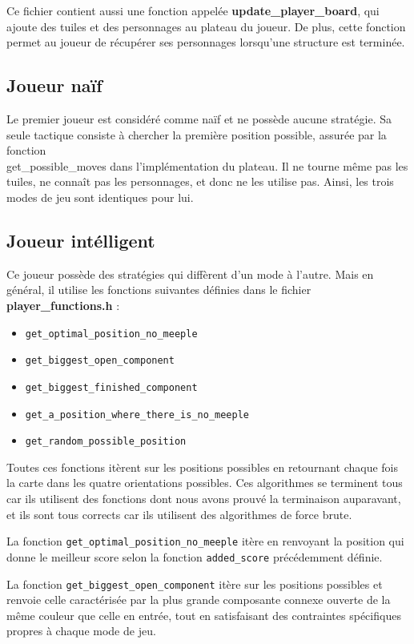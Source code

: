 \documentclass[10pt]{article}
\begin{document}
Ce fichier contient aussi une fonction appelée \textbf{update\_player\_board}, qui ajoute des tuiles et des personnages au plateau du joueur. De plus, cette fonction permet au joueur de récupérer ses personnages lorsqu'une structure est terminée.

\subsection{Joueur naïf}
Le premier joueur est considéré comme naïf et ne possède aucune stratégie. Sa seule tactique consiste à chercher la première position possible, assurée par la fonction \\get\_possible\_moves dans l'implémentation du plateau. Il ne tourne même pas les tuiles, ne connaît pas les personnages, et donc ne les utilise pas. Ainsi, les trois modes de jeu sont identiques pour lui.



\subsection{Joueur intélligent}

Ce joueur possède des stratégies qui diffèrent d'un mode à l'autre. Mais en général, il utilise les fonctions suivantes définies dans le fichier \textbf{player\_functions.h} :

\begin{itemize}
    \item \texttt{get\_optimal\_position\_no\_meeple}
    \item \texttt{get\_biggest\_open\_component}
    \item \texttt{get\_biggest\_finished\_component}
    \item \texttt{get\_a\_position\_where\_there\_is\_no\_meeple}
    \item \texttt{get\_random\_possible\_position}
\end{itemize}
Toutes ces fonctions itèrent sur les positions possibles en retournant chaque fois la carte dans les quatre orientations possibles. Ces algorithmes se terminent tous car ils utilisent des fonctions dont nous avons prouvé la terminaison auparavant, et ils sont tous corrects car ils utilisent des algorithmes de force brute.

La fonction \texttt{get\_optimal\_position\_no\_meeple} itère en renvoyant la position qui donne le meilleur score selon la fonction \texttt{added\_score} précédemment définie.

La fonction \texttt{get\_biggest\_open\_component} itère sur les positions possibles et renvoie celle caractérisée par la plus grande composante connexe ouverte de la même couleur que celle en entrée, tout en satisfaisant des contraintes spécifiques propres à chaque mode de jeu.
\end{document}
